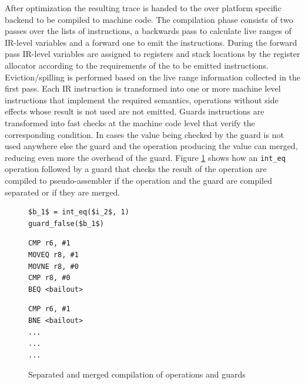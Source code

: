 \documentclass[10pt,preprint]{sigplanconf}
\newcommand\bivab[1]{\nb{DAVID}{#1}}
\begin{document}
After optimization the resulting trace is handed to the over platform specific
backend to be compiled to machine code. The compilation phase consists of two
passes over the lists of instructions, a backwards pass to calculate live
ranges of IR-level variables and a forward one to emit the instructions. During
the forward pass IR-level variables are assigned to registers and stack
locations by the register allocator according to the requirements of the to be
emitted instructions.  Eviction/spilling is performed based on the live range
information collected in the first pass. Each IR instruction is transformed
into one or more machine level instructions that implement the required
semantics, operations without side effects whose result is not used are not
emitted. Guards instructions are transformed into fast checks at the machine
code level that verify the corresponding condition.  In cases the value being
checked by the guard is not used anywhere else the guard and the operation
producing the value can merged, reducing even more the overhead of the guard.
Figure \ref{fig:trace-compiled} shows how an \texttt{int\_eq} operation
followed by a guard that checks the result of the operation are compiled to
pseudo-assembler if the operation and the guard are compiled separated or if
they are merged.

\bivab{Figure needs better formatting}
\begin{figure}[ht]
  \noindent
  \centering
  \begin{minipage}{1\columnwidth}
    \begin{lstlisting}[mathescape]
$b_1$ = int_eq($i_2$, 1)
guard_false($b_1$)
    \end{lstlisting}
  \end{minipage}
  \begin{minipage}{.40\columnwidth}
    \begin{lstlisting}
CMP r6, #1
MOVEQ r8, #1
MOVNE r8, #0
CMP r8, #0
BEQ <bailout>
    \end{lstlisting}
  \end{minipage}
  \hfill
  \begin{minipage}{.40\columnwidth}
    \begin{lstlisting}
CMP r6, #1
BNE <bailout>
...
...
...
    \end{lstlisting}
  \end{minipage}
  \caption{Separated and merged compilation of operations and guards}
  \label{fig:trace-compiled}
\end{figure}
\end{document}
